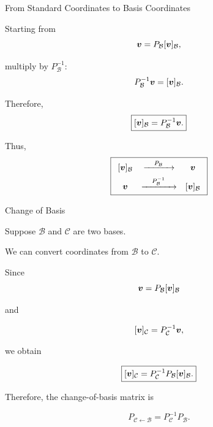 \begin{frame}{From Standard Coordinates to Basis Coordinates}

Starting from
\vspace{-0.1cm}
\[
\bm{v}
=
P_{\mathcal{B}}[\bm{v}]_{\mathcal{B}},
\]

multiply by $P_{\mathcal{B}}^{-1}$:
\vspace{-0.1cm}
\[
P_{\mathcal{B}}^{-1}\bm{v}
=
[\bm{v}]_{\mathcal{B}}.
\]

Therefore,
\vspace{-0.1cm}
\[
\boxed{
[\bm{v}]_{\mathcal{B}}
=
P_{\mathcal{B}}^{-1}\bm{v}.
}
\]

Thus,
\vspace{-0.1cm}
\[
\boxed{
\begin{array}{ccc}
[\bm{v}]_{\mathcal{B}}
&\xrightarrow{\quad P_{\mathcal{B}}\quad}&
\bm{v}\\[4pt]
\bm{v}
&\xrightarrow{\quad P_{\mathcal{B}}^{-1}\quad}&
[\bm{v}]_{\mathcal{B}}
\end{array}
}
\]

\end{frame}



\begin{frame}{Change of Basis}

Suppose $\mathcal{B}$ and $\mathcal{C}$ are two bases.

We can convert coordinates from $\mathcal{B}$ to $\mathcal{C}$.

Since
\vspace{-0.1cm}
\[
\bm{v}
=
P_{\mathcal{B}}[\bm{v}]_{\mathcal{B}}
\]

and

\[
[\bm{v}]_{\mathcal{C}}
=
P_{\mathcal{C}}^{-1}\bm{v},
\]

we obtain

\[
\boxed{
[\bm{v}]_{\mathcal{C}}
=
P_{\mathcal{C}}^{-1}
P_{\mathcal{B}}
[\bm{v}]_{\mathcal{B}}.
}
\]

Therefore, the change-of-basis matrix is

\[
\boxed{
P_{\mathcal{C}\leftarrow\mathcal{B}}
=
P_{\mathcal{C}}^{-1}P_{\mathcal{B}}.
}
\]

\end{frame}



